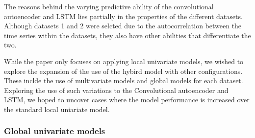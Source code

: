 The reasons behind the varying predictive ability of the convolutional autoencoder and LSTM lies partially
in the properties of the different datasets.
Although datasets 1 and 2 were selcted due to the autocorrelation between the time series within the datasets,
they also have other abilities that differentiate the two.





While the paper \cite{Zhao2019} only focuses on applying local univariate models,
we wished to explore the expansion of the use of the hybird model with other configurations.
These inclde the use of multivariate models and global models for each dataset.
Exploring the use of such variations to the Convolutional autoencoder and LSTM,
we hoped to uncover cases where the model performance is increased over the standard local uniariate model.



\subsubsection{Global univariate models}


